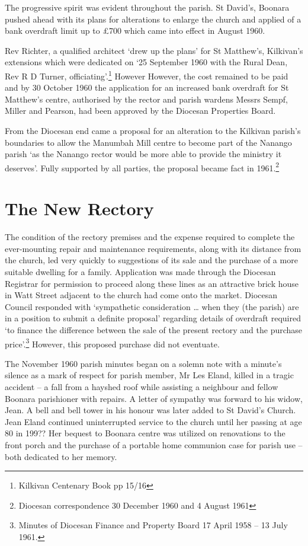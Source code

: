The progressive spirit was evident throughout the parish. St David's,
Boonara pushed ahead with its plans for alterations to enlarge the
church and applied of a bank overdraft limit up to £700 which came into
effect in August 1960.

Rev Richter, a qualified architect `drew up the plans' for St Matthew's,
Kilkivan's extensions which were dedicated on `25 September 1960 with
the Rural Dean, Rev R D Turner, officiating'.\footnote{Kilkivan
  Centenary Book pp 15/16} However However, the cost remained to be paid
and by 30 October 1960 the application for an increased bank overdraft
for St Matthew's centre, authorised by the rector and parish wardens
Messrs Sempf, Miller and Pearson, had been approved by the Diocesan
Properties Board.

From the Diocesan end came a proposal for an alteration to the Kilkivan
parish's boundaries to allow the Manumbah Mill centre to become part of
the Nanango parish `as the Nanango rector would be more able to provide
the ministry it deserves'. Fully supported by all parties, the proposal
became fact in 1961.\footnote{Diocesan correspondence 30 December 1960
  and 4 August 1961}

\hypertarget{the-new-rectory}{%
\section{The New Rectory}\label{the-new-rectory}}

The condition of the rectory premises and the expense required to
complete the ever-mounting repair and maintenance requirements, along
with its distance from the church, led very quickly to suggestions of
its sale and the purchase of a more suitable dwelling for a family.
Application was made through the Diocesan Registrar for permission to
proceed along these lines as an attractive brick house in Watt Street
adjacent to the church had come onto the market. Diocesan Council
responded with `sympathetic consideration \ldots{} when they (the
parish) are in a position to submit a definite proposal' regarding
details of overdraft required `to finance the difference between the
sale of the present rectory and the purchase price'.\footnote{Minutes of
  Diocesan Finance and Property Board 17 April 1958 -- 13 July 1961.}
However, this proposed purchase did not eventuate.

The November 1960 parish minutes began on a solemn note with a minute's
silence as a mark of respect for parish member, Mr Les Eland, killed in
a tragic accident -- a fall from a hayshed roof while assisting a
neighbour and fellow Boonara parishioner with repairs. A letter of
sympathy was forward to his widow, Jean. A bell and bell tower in his
honour was later added to St David's Church. Jean Eland continued
uninterrupted service to the church until her passing at age 80 in 199??
Her bequest to Boonara centre was utilized on renovations to the front
porch and the purchase of a portable home communion case for parish use
-- both dedicated to her memory.

